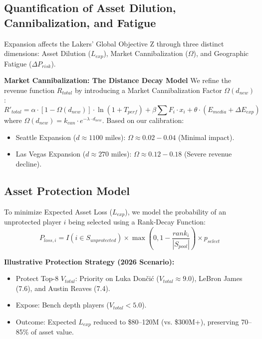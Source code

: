 \documentclass[12pt]{article}
\begin{document}
\subsection{Quantification of Asset Dilution, Cannibalization, and Fatigue}
Expansion affects the Lakers' Global Objective Z through three distinct dimensions: Asset Dilution ($L_{exp}$), Market Cannibalization ($\Omega$), and Geographic Fatigue ($\Delta P_{risk}$).

\textbf{Market Cannibalization: The Distance Decay Model}
We refine the revenue function $R_{total}$ by introducing a Market Cannibalization Factor $\Omega(d_{new})$:
\begin{equation}
R'_{total} = \alpha \cdot [1 - \Omega(d_{new})] \cdot \ln(1 + T_{perf}) + \beta \sum F_i \cdot x_i + \theta \cdot (E_{media} + \Delta E_{exp})
\end{equation}
where $\Omega(d_{new}) = k_{can} \cdot e^{-\lambda \cdot d_{new}}$. Based on our calibration:
\begin{itemize}
    \item Seattle Expansion ($d \approx 1100$ miles): $\Omega \approx 0.02-0.04$ (Minimal impact).
    \item Las Vegas Expansion ($d \approx 270$ miles): $\Omega \approx 0.12-0.18$ (Severe revenue decline).
\end{itemize}

\subsection{Asset Protection Model}
To minimize Expected Asset Loss ($L_{exp}$), we model the probability of an unprotected player $i$ being selected using a Rank-Decay Function:
\begin{equation}
P_{loss,i} = I(i \in S_{unprotected}) \times \max \left(0, 1 - \frac{rank_i}{|S_{pool}|} \right) \times p_{select}
\end{equation}

\textbf{Illustrative Protection Strategy (2026 Scenario):}
\begin{itemize}
    \item Protect Top-8 $V_{total}$: Priority on Luka Dončić ($V_{total} \approx 9.0$), LeBron James (7.6), and Austin Reaves (7.4).
    \item Expose: Bench depth players ($V_{total} < 5.0$).
    \item Outcome: Expected $L_{exp}$ reduced to \$80–120M (vs. \$300M+), preserving 70–85\% of asset value.
\end{itemize}
\end{document}
